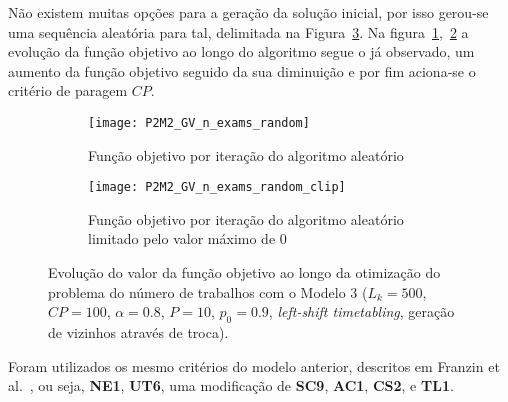 Não existem muitas opções para a geração da solução inicial, por isso gerou-se uma sequência aleatória para tal, delimitada na Figura~\ref{fig:P2M2_GV_dif_sol_ini}. Na figura~\ref{fig:P2M2_GV_n_exams_random},~\ref{fig:P2M2_GV_n_exams_random_clip} a evolução da função objetivo ao longo do algoritmo segue o já observado, um aumento da função objetivo seguido da sua diminuição e por fim aciona-se o critério de paragem $CP$. \\
\begin{figure}[H]
    \centering
    \begin{subfigure}{0.49\textwidth}
        \centering
        \texttt{[image: P2M2\_GV\_n\_exams\_random]}
        \caption{Função objetivo por iteração do algoritmo aleatório}
        \label{fig:P2M2_GV_n_exams_random}
    \end{subfigure}
    \hfill
    \begin{subfigure}{0.49\textwidth}
        \centering
        \texttt{[image: P2M2\_GV\_n\_exams\_random\_clip]}
        \caption{Função objetivo por iteração do algoritmo aleatório limitado pelo valor máximo de 0}
        \label{fig:P2M2_GV_n_exams_random_clip}
    \end{subfigure}
    \caption{Evolução do valor da função objetivo ao longo da otimização do problema do número de trabalhos com o Modelo 3 ($L_{k}=500$, $CP=100$, $\alpha=0.8$, $P=10$, $p_{0}=0.9$, \textit{left-shift timetabling}, geração de vizinhos através de troca).}
    \label{fig:P2M2_GV_dif_sol_ini}
\end{figure}

Foram utilizados os mesmo critérios do modelo anterior, descritos em Franzin et al.~\cite{franzinRevisitingSimulatedAnnealing2019}, ou seja, \textbf{NE1}, \textbf{UT6}, uma modificação de \textbf{SC9}, \textbf{AC1}, \textbf{CS2}, e \textbf{TL1}.\\